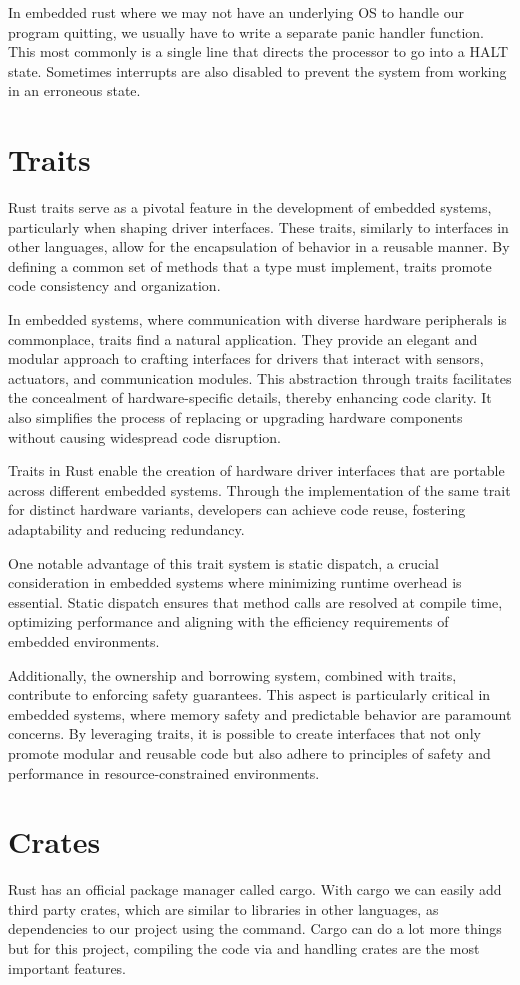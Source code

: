 In embedded rust where we may not have an underlying OS to handle our program quitting, we usually have to write a separate panic handler function. This most commonly is a single line that directs the processor to go into a HALT state. Sometimes interrupts are also disabled to prevent the system from working in an erroneous state.

\section{Traits}

Rust traits serve as a pivotal feature in the development of embedded systems, particularly when shaping driver interfaces. These traits, similarly to interfaces in other languages, allow for the encapsulation of behavior in a reusable manner. By defining a common set of methods that a type must implement, traits promote code consistency and organization.

In embedded systems, where communication with diverse hardware peripherals is commonplace, traits find a natural application. They provide an elegant and modular approach to crafting interfaces for drivers that interact with sensors, actuators, and communication modules. This abstraction through traits facilitates the concealment of hardware-specific details, thereby enhancing code clarity. It also simplifies the process of replacing or upgrading hardware components without causing widespread code disruption.

Traits in Rust enable the creation of hardware driver interfaces that are portable across different embedded systems. Through the implementation of the same trait for distinct hardware variants, developers can achieve code reuse, fostering adaptability and reducing redundancy.

One notable advantage of this trait system is static dispatch, a crucial consideration in embedded systems where minimizing runtime overhead is essential. Static dispatch ensures that method calls are resolved at compile time, optimizing performance and aligning with the efficiency requirements of embedded environments.

Additionally, the ownership and borrowing system, combined with traits, contribute to enforcing safety guarantees. This aspect is particularly critical in embedded systems, where memory safety and predictable behavior are paramount concerns. By leveraging traits, it is possible to create interfaces that not only promote modular and reusable code but also adhere to principles of safety and performance in resource-constrained environments.

\section{Crates}

Rust has an official package manager called cargo. With cargo we can easily add third party crates, which are similar to libraries in other languages, as dependencies to our project using the  command. Cargo can do a lot more things but for this project, compiling the code via  and handling crates are the most important features.
